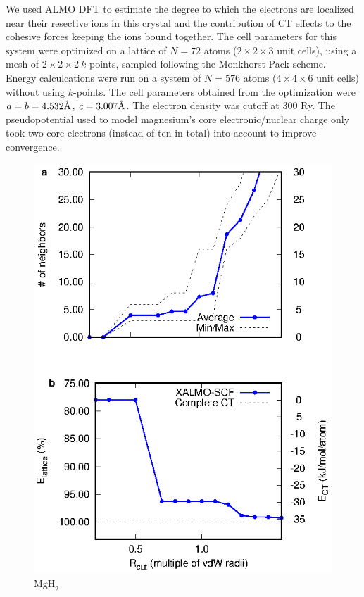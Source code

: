 \documentclass[aps,prb,twocolumn,amsmath,amssymb,superscriptaddress,longbibliography]{revtex4-1}
\newcommand{\angstrom}{\text{\normalfont\AA}}
\begin{document}
We used ALMO DFT to estimate the degree to which the electrons are localized near their resective ions in this crystal and the contribution of CT effects to the cohesive forces keeping the ions bound together.    
The cell parameters for this system were optimized on a lattice of $N = 72$ atoms ($2\times 2\times 3$ unit cells), using a mesh of $2\times 2\times 2\: k$-points, sampled following the Monkhorst-Pack scheme\cite{kpts}.\\ 
Energy calculcations were run on a system of $N = 576$ atoms ($4\times 4\times 6$ unit cells) without using $k$-points.
The cell parameters obtained from the optimization were $a = b = 4.532\angstrom$, $c = 3.007\angstrom$.
The electron density was cutoff at 300 Ry. 
The pseudopotential used to model magnesium's core electronic/nuclear charge only took two core electrons (instead of ten in total) into account to improve convergence.
 
\begin{figure}
\includegraphics[scale=1]{plots/MgH2_EvR}
\caption{$\text{MgH}_{2}$}
\label{mgh2}
\end{figure}
\end{document}
